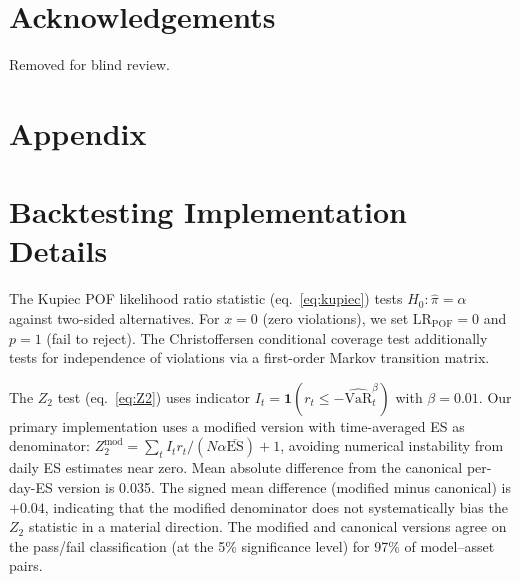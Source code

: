 \documentclass[preprint,11pt,authoryear]{elsarticle}
\newcommand{\VaR}{\mathrm{VaR}}
\newcommand{\ES}{\mathrm{ES}}
\newcommand{\1}{\boldsymbol{1}}
\begin{document}
	\section*{Acknowledgements}
	Removed for blind review.
	
	
	
	
	
	
	
	
	\newpage
	\appendix
	\renewcommand{\thesection}{\Alph{section}}
	
	\section*{Appendix}
	
	\section{Backtesting Implementation Details}
	\label{app:backtesting}
	
	The Kupiec POF likelihood ratio statistic (eq.~\ref{eq:kupiec})
	tests $H_0: \hat\pi = \alpha$ against two-sided alternatives.
	For $x=0$ (zero violations), we set $\mathrm{LR}_{\mathrm{POF}}=0$
	and $p=1$ (fail to reject). The Christoffersen conditional coverage
	test \citep{christoffersen1998} additionally tests for independence
	of violations via a first-order Markov transition matrix.
	
	The $Z_2$ test (eq.~\ref{eq:Z2}) uses indicator
	$I_t = \1(r_t \leq -\widehat{\VaR}_t^\beta)$ with $\beta = 0.01$.
	Our primary implementation uses a modified version with
	time-averaged ES as denominator:
	$Z_2^{\text{mod}} = \sum_t I_t r_t / (N\alpha\overline{\ES}) + 1$,
	avoiding numerical instability from daily ES estimates near zero.
	Mean absolute difference from the canonical per-day-ES version
	is 0.035. The signed mean difference (modified minus canonical) is $+0.04$, indicating that the modified denominator does not systematically bias the $Z_2$ statistic in a material direction. The modified and canonical versions agree on the pass/fail classification (at the 5\% significance level) for 97\% of model--asset pairs.
	
\end{document}
